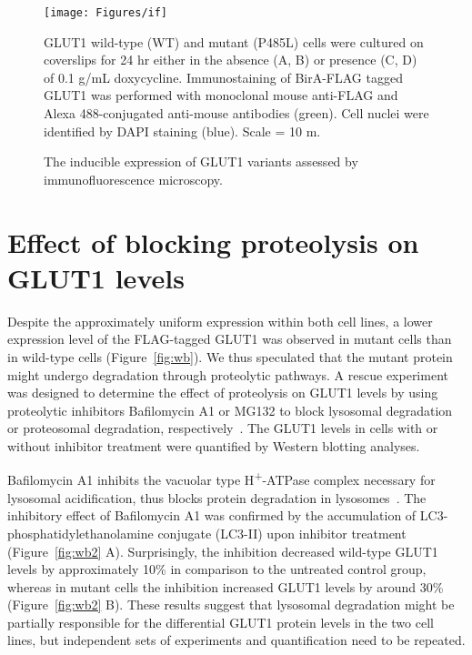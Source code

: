 \begin{figure}[h]
\centering
\texttt{[image: Figures/if]}
\caption{The inducible expression of GLUT1 variants assessed by immunofluorescence microscopy.}
\vspace*{-3mm}
\small \justify
GLUT1 wild-type (WT) and mutant (P485L) cells were cultured on coverslips for 24 hr either in the absence (A, B) or presence (C, D) of 0.1 {}\textmu g/mL doxycycline. Immunostaining of BirA-FLAG tagged GLUT1 was performed with monoclonal mouse anti-FLAG and Alexa 488-conjugated anti-mouse antibodies (green). Cell nuclei were identified by DAPI staining (blue). Scale = 10 \textmu m.
\label{fig:if}
\end{figure}

\section{Effect of blocking proteolysis on GLUT1 levels}
Despite the approximately uniform expression within both cell lines, a lower expression level of the FLAG-tagged GLUT1 was observed in mutant cells than in wild-type cells (Figure~\ref{fig:wb}). We thus speculated that the mutant protein might undergo degradation through proteolytic pathways. A rescue experiment was designed to determine the effect of proteolysis on GLUT1 levels by using proteolytic inhibitors Bafilomycin A1 or MG132 to block lysosomal degradation or proteosomal degradation, respectively~\cite{Tanida,Lee.2}. The GLUT1 levels in cells with or without inhibitor treatment were quantified by Western blotting analyses.

Bafilomycin A1 inhibits the vacuolar type H\textsuperscript{+}-ATPase complex necessary for lysosomal acidification, thus blocks protein degradation in lysosomes~\cite{Yamamoto,Klionsky}. The inhibitory effect of Bafilomycin A1 was confirmed by the accumulation of LC3-phosphatidylethanolamine conjugate (LC3-II) upon inhibitor treatment (Figure~\ref{fig:wb2} A). Surprisingly, the inhibition decreased wild-type GLUT1 levels by approximately 10\% in comparison to the untreated control group, whereas in mutant cells the inhibition increased GLUT1 levels by around 30\% (Figure~\ref{fig:wb2} B). These results suggest that lysosomal degradation might be partially responsible for the differential GLUT1 protein levels in the two cell lines, but independent sets of experiments and quantification need to be repeated.

